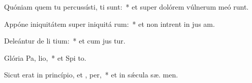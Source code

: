 \item Quóniam quem tu percussísti, ti sunt:~* et super dolórem vúlnerum meó runt.
\item Appóne iniquitátem super iniquitá rum:~* et non intrent in jus am.
\item Deleántur de li tium:~* et cum jus  tur.
\item Glória Pa,  lio,~* et Spi to.
\item Sicut erat in princípio, et ,  per,~* et in sǽcula sæ. men.
